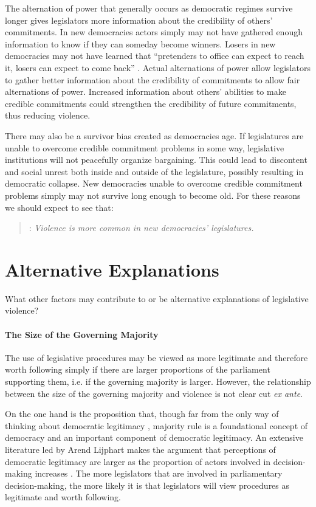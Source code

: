 \documentclass[a4paper]{article}\usepackage[]{graphicx}\usepackage[]{color}
\begin{document}
The alternation of power that generally occurs as democratic regimes survive longer gives legislators more information about the credibility of others' commitments. In new democracies actors simply may not have gathered enough information to know if they can someday become winners. Losers in new democracies may not have learned that ``pretenders to office can expect to reach it, losers can expect to come back'' \citep[][36]{Przeworski1991}. Actual alternations of power allow legislators to gather better information about the credibility of commitments to allow fair alternations of power. Increased information about others' abilities to make credible commitments could strengthen the credibility of future commitments, thus reducing violence.

There may also be a survivor bias created as democracies age. If legislatures are unable to overcome credible commitment problems in some way, legislative institutions will not peacefully organize bargaining. This could lead to discontent and social unrest both inside and outside of the legislature, possibly resulting in democratic collapse. New democracies unable to overcome credible commitment problems simply may not survive long enough to become old. For these reasons we should expect to see that:

\begin{quote}
    : \emph{Violence is more common in new democracies' legislatures.}
\end{quote}

\section{Alternative Explanations}

What other factors may contribute to or be alternative explanations of legislative violence?

\paragraph{The Size of the Governing Majority}

The use of legislative procedures may be viewed as more legitimate and therefore worth following simply if there are larger proportions of the parliament supporting them, i.e. if the governing majority is larger. However, the relationship between the size of the governing majority and violence is not clear cut \emph{ex ante}.

On the one hand is the proposition that, though far from the only way of thinking about democratic legitimacy \cite{Follesdal2006}, majority rule is a foundational concept of democracy \citep{Dahl1989} and an important component of democratic legitimacy. An extensive literature led by Arend Lijphart makes the argument that perceptions of democratic legitimacy are larger as the proportion of actors involved in decision-making increases \citep[]{Lijphart2007}. The more legislators that are involved in parliamentary decision-making, the more likely it is that legislators will view procedures as legitimate and worth following.
\end{document}
